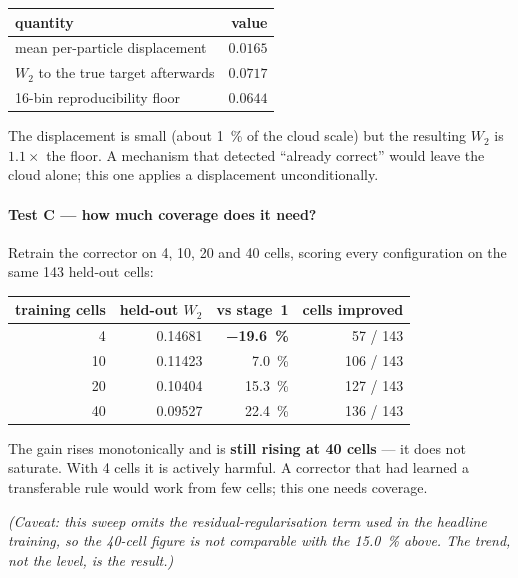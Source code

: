 ﻿\documentclass[11pt,a4paper]{article}
\newcommand{\Wtwo}{W_2}
\begin{document}
\begin{table}[h]
\centering\small
\begin{tabular}{@{}lr@{}}
\toprule
quantity & value \\
\midrule
mean per-particle displacement & $0.0165$ \\
$\Wtwo$ to the true target afterwards & \textbf{$0.0717$} \\
16-bin reproducibility floor & $0.0644$ \\
\bottomrule
\end{tabular}
\end{table}

The displacement is small (about \SI{1}{\percent} of the cloud scale) but the resulting $\Wtwo$ is
$1.1\times$ the floor. A mechanism that detected ``already correct'' would leave the cloud alone;
this one applies a displacement unconditionally.

\paragraph{Test C --- how much coverage does it need?} Retrain the corrector on 4, 10, 20 and 40
cells, scoring every configuration on the same 143 held-out cells:

\begin{table}[h]
\centering\small
\begin{tabular}{@{}rrrr@{}}
\toprule
training cells & held-out $\Wtwo$ & vs stage~1 & cells improved \\
\midrule
4 & 0.14681 & \textbf{\SI{-19.6}{\percent}} & 57 / 143 \\
10 & 0.11423 & \SI{7.0}{\percent} & 106 / 143 \\
20 & 0.10404 & \SI{15.3}{\percent} & 127 / 143 \\
40 & 0.09527 & \SI{22.4}{\percent} & 136 / 143 \\
\bottomrule
\end{tabular}
\end{table}

The gain rises monotonically and is \textbf{still rising at 40 cells} --- it does not saturate. With
4 cells it is actively harmful. A corrector that had learned a transferable rule would work from few
cells; this one needs coverage.

\emph{(Caveat: this sweep omits the residual-regularisation term used in the headline training, so the
40-cell figure is not comparable with the \SI{15.0}{\percent} above. The trend, not the level, is the
result.)}
\end{document}
